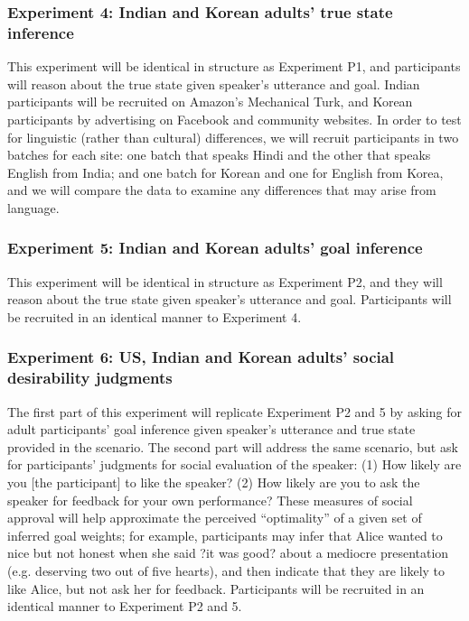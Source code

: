 \subsubsection{Experiment 4: Indian and Korean adults' true state inference} 
This experiment will be identical in structure as Experiment P1, and participants will reason about the true state given speaker's utterance and goal. Indian participants will be recruited on Amazon's Mechanical Turk, and Korean participants by advertising on Facebook and community websites. In order to test for linguistic (rather than cultural) differences, we will recruit participants in two batches for each site: one batch that speaks Hindi and the other that speaks English from India; and one batch for Korean and one for English from Korea, and we will compare the data to examine any differences that may arise from language.  

\subsubsection{Experiment 5: Indian and Korean adults' goal inference} 
This experiment will be identical in structure as Experiment P2, and they will reason about the true state given speaker's utterance and goal. Participants will be recruited in an identical manner to Experiment 4. 

\subsubsection{Experiment 6: US, Indian and Korean adults' social desirability judgments} The first part of this experiment will replicate Experiment P2 and 5 by asking for adult participants' goal inference given speaker's utterance and true state provided in the scenario. The second part will address the same scenario, but ask for participants' judgments for social evaluation of the speaker: (1) How likely are you [the participant] to like the speaker? (2) How likely are you to ask the speaker for feedback for your own performance? These measures of social approval will help approximate the perceived ``optimality'' of a given set of inferred goal weights; for example, participants may infer that Alice wanted to nice but not honest when she said ?it was good? about a mediocre presentation (e.g. deserving two out of five hearts), and then indicate that they are likely to like Alice, but not ask her for feedback. Participants will be recruited in an identical manner to Experiment P2 and 5.

